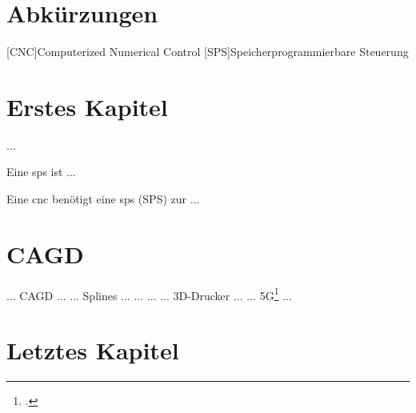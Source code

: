 \documentclass[12pt,a4paper]{scrbook}
\begin{document}
\listoffigures
\cleardoublepage

\listoftables
\cleardoublepage

%

 
\chapter*{Abkürzungen}
\begin{acronym}
     [CNC]{Computerized Numerical Control}
     [SPS]{Speicherprogrammierbare Steuerung}
\end{acronym}
\cleardoublepage
 
 
\chapter{Erstes Kapitel}

$\ldots$

Eine \ac{sps} ist $\ldots$

Eine \ac{cnc} benötigt eine \ac{sps}  (SPS)  zur $\ldots$

\chapter{CAGD}

... CAGD \cite{Farin2001} ...
... Splines ... \cite{DIN66025}
... \cite{Farouki2017} ...
... 3D-Drucker ... \cite{Patent3D}
... 5G\footcite{Zafeiropoulos2020} ...

\chapter{Letztes Kapitel}
 
\blindtext
\cleardoublepage

\printbibliography
\cleardoublepage

\renewcommand{\indexname}{Stichwortverzeichnis}
\printindex
   
\end{document}
